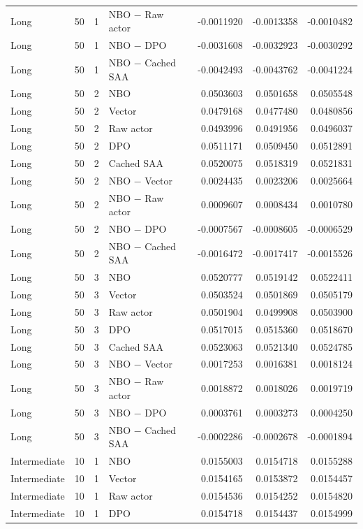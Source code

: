 \begin{longtable}{llrlrrr}
Long & 50 & 1 & NBO $-$ Raw actor & -0.0011920 & -0.0013358 & -0.0010482 \\
Long & 50 & 1 & NBO $-$ DPO & -0.0031608 & -0.0032923 & -0.0030292 \\
Long & 50 & 1 & NBO $-$ Cached SAA & -0.0042493 & -0.0043762 & -0.0041224 \\
Long & 50 & 2 & NBO & 0.0503603 & 0.0501658 & 0.0505548 \\
Long & 50 & 2 & Vector & 0.0479168 & 0.0477480 & 0.0480856 \\
Long & 50 & 2 & Raw actor & 0.0493996 & 0.0491956 & 0.0496037 \\
Long & 50 & 2 & DPO & 0.0511171 & 0.0509450 & 0.0512891 \\
Long & 50 & 2 & Cached SAA & 0.0520075 & 0.0518319 & 0.0521831 \\
Long & 50 & 2 & NBO $-$ Vector & 0.0024435 & 0.0023206 & 0.0025664 \\
Long & 50 & 2 & NBO $-$ Raw actor & 0.0009607 & 0.0008434 & 0.0010780 \\
Long & 50 & 2 & NBO $-$ DPO & -0.0007567 & -0.0008605 & -0.0006529 \\
Long & 50 & 2 & NBO $-$ Cached SAA & -0.0016472 & -0.0017417 & -0.0015526 \\
Long & 50 & 3 & NBO & 0.0520777 & 0.0519142 & 0.0522411 \\
Long & 50 & 3 & Vector & 0.0503524 & 0.0501869 & 0.0505179 \\
Long & 50 & 3 & Raw actor & 0.0501904 & 0.0499908 & 0.0503900 \\
Long & 50 & 3 & DPO & 0.0517015 & 0.0515360 & 0.0518670 \\
Long & 50 & 3 & Cached SAA & 0.0523063 & 0.0521340 & 0.0524785 \\
Long & 50 & 3 & NBO $-$ Vector & 0.0017253 & 0.0016381 & 0.0018124 \\
Long & 50 & 3 & NBO $-$ Raw actor & 0.0018872 & 0.0018026 & 0.0019719 \\
Long & 50 & 3 & NBO $-$ DPO & 0.0003761 & 0.0003273 & 0.0004250 \\
Long & 50 & 3 & NBO $-$ Cached SAA & -0.0002286 & -0.0002678 & -0.0001894 \\
Intermediate & 10 & 1 & NBO & 0.0155003 & 0.0154718 & 0.0155288 \\
Intermediate & 10 & 1 & Vector & 0.0154165 & 0.0153872 & 0.0154457 \\
Intermediate & 10 & 1 & Raw actor & 0.0154536 & 0.0154252 & 0.0154820 \\
Intermediate & 10 & 1 & DPO & 0.0154718 & 0.0154437 & 0.0154999 \\

\end{longtable}
